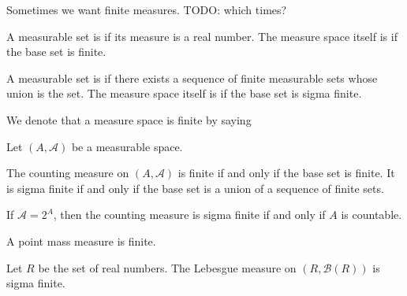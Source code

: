 
\sbasic













\sstart
{}


Sometimes we want finite measures.
TODO: which times?


A measurable set is
if its measure is a real number.
The measure space itself is
if the base set is finite.

A measurable set is
if there exists a sequence of
finite measurable sets whose
union is the set.
The measure space itself is
if the base set is sigma finite.


We denote that a measure
space is finite by saying

\begin{expl}
Let $(A, \mathcal{A})$ be a measurable space.

The counting measure on $(A, \mathcal{A})$ is
finite if and only if the base set is finite.
It is sigma finite if and only if the base
set is a union of a sequence of finite sets.

If $\mathcal{A} = 2^A$, then the counting
measure is sigma finite if and only if
$A$ is countable.
\end{expl}

\begin{expl}
A point mass measure is finite.
\end{expl}

\begin{expl}
Let $R$ be the set of real numbers.
The Lebesgue measure on
$(R, \mathcal{B}(R))$ is sigma finite.
\end{expl}
\strats
